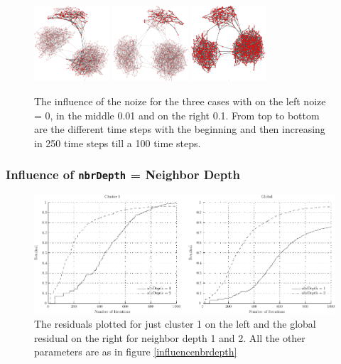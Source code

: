 \begin{figure}
\includegraphics[width=0.25\textwidth]{batchRun__kHalf=2-2-2_maxUpdate=0.02_noize=0_nbrDepth=1/network1000-crop.pdf}
\hfill
\includegraphics[width=0.25\textwidth]{batchRun__kHalf=2-2-2_maxUpdate=0.02_noize=0.01_nbrDepth=1/network1000-crop.pdf}
\hfill
\includegraphics[width=0.25\textwidth]{batchRun__kHalf=2-2-2_maxUpdate=0.02_noize=0.1_nbrDepth=1/network1000-crop.pdf}

\caption{The influence of the noize for the three cases with on the left noize = 0, in the middle 0.01 and on the right 0.1. From top to bottom are the different time steps with the beginning and then increasing in 250 time steps till a 100 time steps.}
\label{influencenoize}
\end{figure}



\subsubsection{Influence of \texttt{nbrDepth} = Neighbor Depth}
\label{sec:nbrDepth}

\begin{figure}
\centering
\includegraphics[width= \textwidth]{influenceOfNbrDepth/influenceNbrDepth.pdf}
\caption{The residuals plotted for just cluster 1 on the left and the global residual on the right for neighbor depth 1 and 2. All the other parameters are as in figure \ref{influencenbrdepth}}
\label{residualNBRdepth}
\end{figure}

